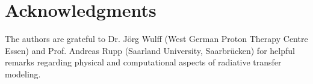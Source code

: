 \documentclass[preprint, 11pt]{elsarticle}
\begin{document}
\section*{Acknowledgments}

The authors are grateful to Dr. Jörg Wulff (West German Proton Therapy Centre Essen) and Prof. Andreas Rupp (Saarland University, Saarbrücken) for helpful remarks regarding physical and computational aspects of radiative transfer modeling.





\end{document}
